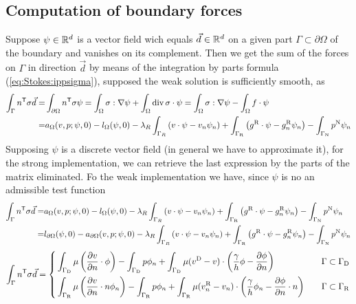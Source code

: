\subsection{Computation of boundary forces}\label{subsec:}
%
Suppose $\psi\in\mathbb R^d$ is a vector field wich equals $\vec{d}\in\mathbb R^d$ on a given part $\Gamma\subset\partial\Omega$ of the boundary and vanishes on its complement. Then we get the sum of the forces on $\Gamma$ in direction $\vec{d}$ by means of the integration by parts formula (\ref{eq:Stokes:ippsigma}), supposed the weak solution is sufficiently smooth, as
%
\begin{align*}
\int_{\Gamma} {n}^{\mathsf{T}}\sigma \vec{d} =& \int_{\partial\Omega} {n}^{\mathsf{T}}\sigma \psi
=\int_{\Omega} \sigma:\nabla\psi  + \int_{\Omega} \operatorname{div} \sigma\cdot \psi
=\int_{\Omega} \sigma:\nabla\psi  -\int_{\Omega} f\cdot \psi\\
=& a_{\Omega}(v,p; \psi,0) - l_{\Omega}(\psi,0) - \lambda_R\int_{\Gamma_R}\left(v\cdot\psi - v_n\psi_n\right)+ \int_{\Gamma_{\rm R}}\left(g^{\rm R}\cdot\psi - g^{\rm R}_n\psi_n\right)
 -\int_{\Gamma_{\rm N}}p^{\rm N} \psi_n
\end{align*}
%
Supposing $\psi$ is a discrete vector field (in general we have to approximate it), for the strong implementation, we can retrieve the last expression by the parts of the matrix eliminated.
Fo the weak implementation we have, since $\psi$ is no an admissible test function
%
\begin{align*}
\int_{\Gamma} {n}^{\mathsf{T}}\sigma \vec{d} =&a_{\Omega}(v,p; \psi,0) - l_{\Omega}(\psi,0) - \lambda_R\int_{\Gamma_R}\left(v\cdot\psi - v_n\psi_n\right)+ \int_{\Gamma_{\rm R}}\left(g^{\rm R}\cdot\psi - g^{\rm R}_n\psi_n\right)
 -\int_{\Gamma_{\rm N}}p^{\rm N} \psi_n\\
=&  l_{\partial\Omega}(\psi,0) - a_{\partial\Omega}(v,p; \psi,0) - \lambda_R\int_{\Gamma_R}\left(v\cdot\psi - v_n\psi_n\right)+ \int_{\Gamma_{\rm R}}\left(g^{\rm R}\cdot\psi - g^{\rm R}_n\psi_n\right)
 -\int_{\Gamma_{\rm N}}p^{\rm N} \psi_n
\end{align*}
%
%
\begin{equation}\label{eq:}
%
\int_{\Gamma} \transpose{n}\sigma \vec{d} =
\left\{
\begin{aligned}
& 
 \int_{\GammaD}\mu \left(  \dn{v}\cdot  \phi \right)
- \int_{\GammaD}  p\phi_n 
+\int_{\GammaD}\mu(\vD-v)\cdot\left( \frac{\gamma}{h}\phi - \dn{\phi}\right)
&\quad \Gamma\subset\GammaD\\ 
& 
 \int_{\GammaR} \mu\left( \dn{v}\cdot n \phi_n \right)
- \int_{\GammaR} p\phi_n  
+\int_{\GammaR}\mu(\vRn-v_n)\cdot\left( \frac{\gamma}{h}\phi_n - \dn{\phi}\cdot n\right)
&\quad \Gamma\subset\GammaR
\end{aligned}
\right.
%
\end{equation}
% 
%
